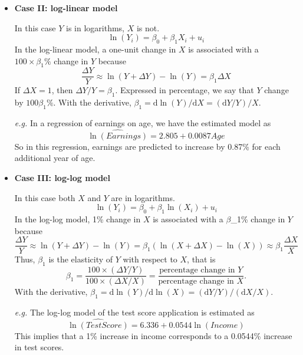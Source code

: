 \documentclass[a4paper,11pt]{article}
\newcommand{\dx}{\mathrm{d}}
\begin{document}
\begin{itemize}
\item \textbf{Case II: log-linear model}
\label{sec:org9255cb1}

In this case \(Y\) is in logarithms, \(X\)
is not.
\begin{equation}
\label{eq:log-linear}
\ln(Y_i) = \beta_0 + \beta_1 X_i + u_i
\end{equation}
In the log-linear model, a one-unit change in \(X\) is associated
with a \(100 \times \beta_1\%\) change in \(Y\) because
\begin{equation*}
\frac{\Delta Y}{Y} \approx \ln(Y + \Delta Y) - \ln(Y) = \beta_1 \Delta X
\end{equation*}
If \(\Delta X = 1\), then \(\Delta Y / Y = \beta_1\). Expressed in
percentage, we say that \(Y\) change by \(100\beta_1\%\). With the
derivative, \(\beta_1 = \dx \ln(Y) / \dx X = (\dx Y/Y) / X\).

\emph{e.g.} In a regression of earnings on age, we have the estimated
model as
\[ \widehat{\ln(Earnings)} = 2.805 + 0.0087Age \]
So in this regression, earnings are predicted to increase by
0.87\% for each additional year of age.

\item \textbf{Case III: log-log model}
\label{sec:orgc692561}

In this case both \(X\) and \(Y\) are in
logarithms.
\begin{equation}
\label{eq:log-log}
\ln(Y_i) = \beta_0 + \beta_1 \ln(X_i) + u_i
\end{equation}
In the log-log model, 1\% change in \(X\) is associated with a
\(\beta\)\_1\% change in \(Y\) because
\[ \frac{\Delta Y}{Y} \approx \ln(Y + \Delta Y) - \ln(Y) =
\beta_1 (\ln(X + \Delta X) - \ln(X)) \approx \beta_1 \frac{\Delta
X}{X} \]
Thus, \(\beta_{\text{1}}\) is the elasticity of \(Y\) with respect to \(X\), that
is
\[ \beta_1 = \frac{100 \times (\Delta Y / Y)}{100\times (\Delta X
/ X)} =\frac{\text{percentage change in } Y}{\text{percentage
change in } X}.\]
With the derivative, \(\beta_1 = \dx \ln(Y) / \dx \ln(X) = (\dx Y/Y) /
(\dx X/X)\).

\emph{e.g.} The log-log model of the test score application is
estimated as
\[ \widehat{\ln(TestScore)} = 6.336 + 0.0544 \ln(Income) \]
This implies that a 1\% increase in income corresponds to a
0.0544\% increase in test scores.


\end{itemize}
\end{document}
